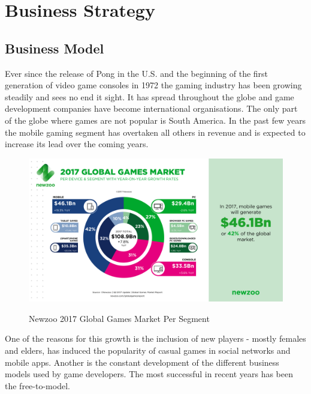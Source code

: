 \documentclass[12p]{article}
\begin{document}
\newpage
\section{Business Strategy} \label{MarketAnalysis}


\subsection{Business Model} 
Ever since the release of Pong\cite{Pong} in the U.S. and the beginning of the first generation of video game consoles in 1972 the gaming industry has been growing steadily and sees no end it sight. It has spread throughout the globe and game development companies have become international organisations. The only part of the globe where games are not popular is South America.\cite{GamesMarketRevenue} In the past few years the mobile gaming segment has overtaken all others in revenue and is expected to increase its lead over the coming years.

\begin{figure}[ht]
  \center
  \includegraphics[width=1\textwidth]{BusinessStrategy/Newzoo_2017_Global_Games_Market_Per_Segment_April_2017}
  \label{Newzoo_2017_Global_Games_Market_Per_Segment_April_2017}
  \caption{Newzoo 2017 Global Games Market Per Segment \cite{NezooScreenshot}}
\end{figure}

One of the reasons for this growth is the inclusion of new players - mostly females and elders, has induced the popularity of casual games in social networks and mobile apps. Another is the constant development of the different business models used by game developers. The most successful in recent years has been the free-to-model.\cite{BusinessModelsAndStrategy}
\end{document}
